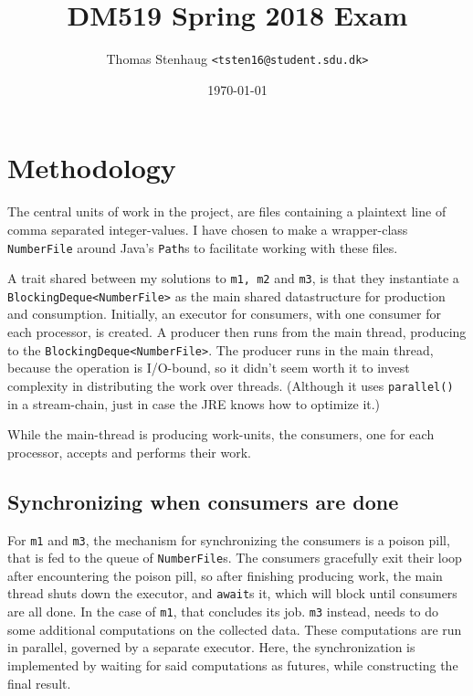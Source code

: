 \documentclass[a4paper,11pt]{article}
\author{Thomas Stenhaug \texttt{<tsten16@student.sdu.dk>}}
\date{\today}
\title{DM519 Spring 2018 Exam}
\begin{document}
\maketitle

\setlength{\baselineskip}{1.44\baselineskip}

\section{Methodology}

The central units of work in the project, are files containing a
plaintext line of comma separated integer-values.  I have chosen to
make a wrapper-class \texttt{NumberFile} around Java's \texttt{Path}s to
facilitate working with these files.

A trait shared between my solutions to \texttt{m1, m2} and
\texttt{m3}, is that they instantiate a
\texttt{BlockingDeque<NumberFile>} as the main shared datastructure for
production and consumption.  Initially, an executor for consumers,
with one consumer for each processor, is created.  A producer then
runs from the main thread, producing to the
\texttt{BlockingDeque<NumberFile>}.  The producer runs in the main
thread, because the operation is I/O-bound, so it didn't seem worth it
to invest complexity in distributing the work over threads.  (Although
it uses \texttt{parallel()} in a stream-chain, just in case the JRE
knows how to optimize it.)

While the main-thread is producing work-units, the consumers, one for
each processor, accepts and performs their work.

\subsection{Synchronizing when consumers are done}

For \texttt{m1} and \texttt{m3}, the mechanism for synchronizing the
consumers is a poison pill, that is fed to the queue of
\texttt{NumberFile}s.  The consumers gracefully exit their loop after
encountering the poison pill, so after finishing producing work, the
main thread shuts down the executor, and \texttt{await}s it, which
will block until consumers are all done.  In the case of \texttt{m1},
that concludes its job.  \texttt{m3} instead, needs to do some
additional computations on the collected data.  These computations are
run in parallel, governed by a separate executor.  Here, the
synchronization is implemented by waiting for said computations as
futures, while constructing the final result.
\end{document}
